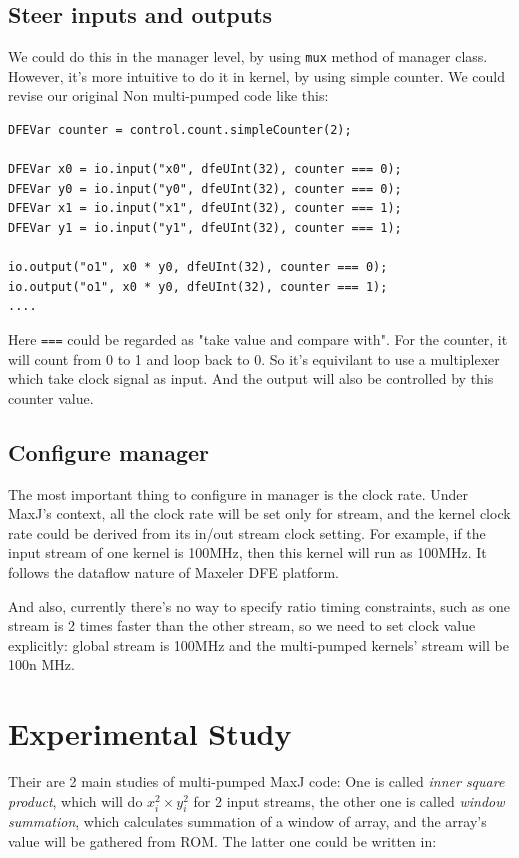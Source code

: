 \documentclass[a4paper, 10pt]{report}
\begin{document}
\subsection{Steer inputs and outputs}
We could do this in the manager level, by using \texttt{mux} method of manager class. However, it's more intuitive to do it in kernel, by using simple counter. We could revise our original Non multi-pumped code like this:
\newpage
\begin{lstlisting}[caption=Non multi-pumped kernel example]
DFEVar counter = control.count.simpleCounter(2);

DFEVar x0 = io.input("x0", dfeUInt(32), counter === 0);
DFEVar y0 = io.input("y0", dfeUInt(32), counter === 0);
DFEVar x1 = io.input("x1", dfeUInt(32), counter === 1);
DFEVar y1 = io.input("y1", dfeUInt(32), counter === 1);

io.output("o1", x0 * y0, dfeUInt(32), counter === 0);
io.output("o1", x0 * y0, dfeUInt(32), counter === 1);
....
\end{lstlisting}


Here \texttt{===} could be regarded as "take value and compare with". For the counter, it will count from 0 to 1 and loop back to 0. So it's equivilant to use a multiplexer which take clock signal as input. And the output will also be controlled by this counter value.

\subsection{Configure manager}
The most important thing to configure in manager is the clock rate. Under MaxJ's context, all the clock rate will be set only for stream, and the kernel clock rate could be derived from its in/out stream clock setting. For example, if the input stream of one kernel is 100MHz, then this kernel will run as 100MHz. It follows the dataflow nature of Maxeler DFE platform.

And also, currently there's no way to specify ratio timing constraints, such as one stream is 2 times faster than the other stream, so we need to set clock value explicitly: global stream is 100MHz and the multi-pumped kernels' stream will be 100n MHz.

\section{Experimental Study}
Their are 2 main studies of multi-pumped MaxJ code: One is called \textit{inner square product}, which will do $x_i^2 \times y_i^2$ for 2 input streams, the other one is called \textit{window summation}, which calculates summation of a window of array, and the array's value will be gathered from ROM. The latter one could be written in:
\end{document}
